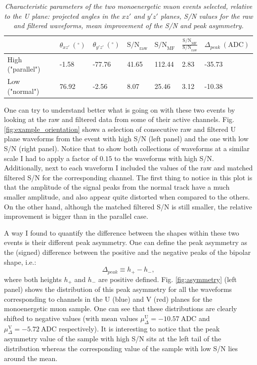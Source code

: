 
\begin{table}[h!]
	\centering
	\caption{\textit{Characteristic parameters of the two monoenergetic muon events selected, relative to the U plane: projected angles in the $xz'$ and $y'z'$ planes, S/N values for the raw and filtered waveforms, mean improvement of the S/N and peak asymmetry.}}
	\begin{tabular}{l|llllll}
		& $\theta_{xz'} \ (^{\circ})$ & $\theta_{y'z'} \ (^{\circ})$ & $\mathrm{S/N}_{\mathrm{raw}}$ & $\mathrm{S/N}_{\mathrm{MF}}$ & $\frac{\mathrm{S/N}_{\mathrm{MF}}}{\mathrm{S/N}_{\mathrm{raw}}}$ & $\Delta_{peak} \ (\mathrm{ADC})$ \\ \hline
		High ("parallel") & -1.58                     & -77.76                     & 41.65       & 112.44      & 2.83                          & -35.73                                                          \\
		Low ("normal")  & 76.92                     & -2.56                      & 8.07        & 25.46       & 3.12                          & -10.38                                                         
	\end{tabular}
	\label{tab:case}
\end{table}

One can try to understand better what is going on with these two events by looking at the raw and filtered data from some of their active channels. Fig. \ref{fig:example_orientation} shows a selection of consecutive raw and filtered U plane waveforms from the event with high S/N (left panel) and the one with low S/N (right panel). Notice that to show both collections of waveforms at a similar scale I had to apply a factor of $0.15$ to the waveforms with high S/N. Additionally, next to each waveform I included the values of the raw and matched filtered S/N for the corresponding channel. The first thing to notice in this plot is that the amplitude of the signal peaks from the normal track have a much smaller amplitude, and also appear quite distorted when compared to the others. On the other hand, although the matched filtered S/N is still smaller, the relative improvement is bigger than in the parallel case.

A way I found to quantify the difference between the shapes within these two events is their different peak asymmetry. One can define the peak asymmetry as the (signed) difference between the positive and the negative peaks of the bipolar shape, i.e.:
\begin{equation}
\Delta_{peak} \equiv h_{+} - h_{-},
\end{equation}
where both heights $h_{+}$ and $h_{-}$ are positive defined. Fig. \ref{fig:asymmetry} (left panel) shows the distribution of this peak asymmetry for all the waveforms corresponding to channels in the U (blue) and V (red) planes for the monoenergetic muon sample. One can see that these distributions are clearly shifted to negative values (with mean values $\mu_{\Delta}^{\mathrm{U}} = -10.57 \ \mathrm{ADC}$ and $\mu_{\Delta}^{\mathrm{V}} = -5.72 \ \mathrm{ADC}$ respectively). It is interesting to notice that the peak asymmetry value of the sample with high S/N sits at the left tail of the distribution whereas the corresponding value of the sample with low S/N lies around the mean.

